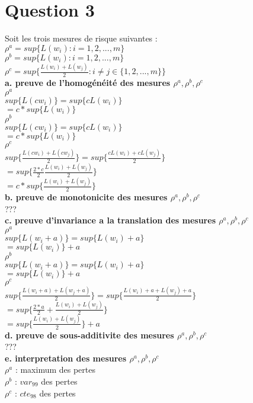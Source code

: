 \section{Question 3}

Soit les trois mesures de risque suivantes :\\
$\rho^a= sup\{L(w_i) : i= 1,2,...,m\}$\\
$\rho^b=  sup\{L(w_i) : i= 1,2,...,m\}$\\
$\rho^c= sup\{\frac{L(w_i)+L(w_j)}{2} : i \neq j \in \{1,2,...,m\}\}$\\


\textbf{a. preuve de l'homogénéité des mesures $\rho^a, \rho^b, \rho^c$}\\
\textbf{$\rho^a$}\\
$sup\{L(cw_i)\} = sup\{cL(w_i)\}$\\
$ = c*sup\{L(w_i)\}$\\

\textbf{$\rho^b$}\\
$sup\{L(cw_i)\} = sup\{cL(w_i)\}$\\
$ = c*sup\{L(w_i)\}$\\

\textbf{$\rho^c$}\\
$sup\{\frac{L(cw_i)+L(cw_j)}{2}\} = sup\{\frac{cL(w_i)+cL(w_j)}{2}\}$\\
$ = sup\{\frac{2*c}{2} \frac{L(w_i)+L(w_j)}{2}\}$\\
$ = c*sup\{ \frac{L(w_i)+L(w_j)}{2}\}$\\

\textbf{b. preuve de monotonicite des mesures $\rho^a, \rho^b, \rho^c$}\\
???\\

\textbf{c. preuve d'invariance a la translation des mesures $\rho^a, \rho^b, \rho^c$}\\

\textbf{$\rho^a$}\\
$sup\{L(w_i+a)\} = sup\{L(w_i)+a\}$\\
$ = sup\{L(w_i)\} + a$\\

\textbf{$\rho^b$}\\
$sup\{L(w_i+a)\} = sup\{L(w_i)+a\}$\\
$ = sup\{L(w_i)\}+a$\\

\textbf{$\rho^c$}\\
$sup\{\frac{L(w_i+a)+L(w_j+a)}{2}\} = sup\{\frac{L(w_i)+a+L(w_j)+a}{2}\}$\\
$ = sup\{\frac{2*a}{2} + \frac{L(w_i)+L(w_j)}{2}\}$\\
$ = sup\{ \frac{L(w_i)+L(w_j)}{2}\} + a$\\

\textbf{d. preuve de sous-additivite des mesures $\rho^a, \rho^b, \rho^c$}\\
???\\

\textbf{e. interpretation des mesures $\rho^a, \rho^b, \rho^c$}\\
$\rho^a$ : maximum des pertes\\
$\rho^b$ : $var_{99}$ des pertes\\
$\rho^c$ : $cte_{98}$ des pertes\\


